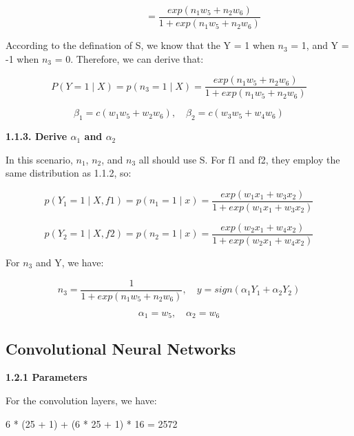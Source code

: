 \documentclass{article} %
\begin{document}
\begin{equation}
\qquad \qquad \quad = \frac{exp(n_1 w_5 + n_2 w_6)}{1 + exp(n_1 w_5 + n_2 w_6)}
\end{equation}

According to the defination of S, we know that the Y = 1 when $n_3$ = 1, and Y = -1
when $n_3$ = 0. Therefore, we can derive that:

\begin{equation}
P(Y=1 \mid X) = p(n_3 = 1 \mid X) = \frac{exp(n_1 w_5 + n_2 w_6)}
{1 + exp(n_1 w_5 + n_2 w_6)}
\end{equation}

\begin{equation}
\beta_1 = c (w_1 w_5 + w_2 w_6),  \quad
\beta_2 = c (w_3 w_5 + w_4 w_6)
\end{equation}

\textbf{1.1.3. Derive $\alpha_1$ and $\alpha_2$}

In this scenario, $n_1$, $n_2$, and $n_3$ all should use S. For f1
and f2, they employ the same distribution as 1.1.2, so:

\begin{equation}
p(Y_1=1 \mid X, f1) = p (n_1=1 \mid x)
= \frac{exp(w_1 x_1 + w_3 x_2)}{1 + exp(w_1 x_1 + w_3 x_2)}
\end{equation}

\begin{equation}
p(Y_2=1 \mid X, f2) = p (n_2=1 \mid x)
= \frac{exp(w_2 x_1 + w_4 x_2)}{1 + exp(w_2 x_1 + w_4 x_2)}
\end{equation}

For $n_3$ and Y, we have:

\begin{equation}
n_3 = \frac{1}{1 + exp(n_1 w_5 + n_2 w_6)}, \quad
y = sign(\alpha_1 Y_1 + \alpha_2 Y_2)
\end{equation}

\begin{equation}
\alpha_1 = w_5, \quad
\alpha_2 = w_6
\end{equation}


\subsection{Convolutional Neural Networks}

\textbf{1.2.1 Parameters}

For the convolution layers, we have:

6 * (25 + 1) + (6 * 25 + 1) * 16 = 2572
\end{document}
